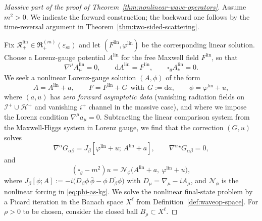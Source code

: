\documentclass[11pt]{article}
\numberwithin{equation}{section}
\theoremstyle{plain}
\theoremstyle{definition}
\theoremstyle{remark}
\newcommand{\dd}{\mathrm{d}}
\begin{document}
\begin{proof}[Massive part of the proof of Theorem~\ref{thm:nonlinear-wave-operators}]
Assume $m^{2}>0$.  We indicate the forward construction; the backward one follows by the time-reversal argument in Theorem~\ref{thm:two-sided-scattering}.

Fix $\mathcal R_{+}^{\mathrm{lin}}\in\mathfrak R_{+}^{(m)}(\varepsilon_{\mathrm{sc}})$ and let $(F^{\mathrm{lin}},\varphi^{\mathrm{lin}})$ be the corresponding linear solution.
Choose a Lorenz-gauge potential $A^{\mathrm{lin}}$ for the free Maxwell field $F^{\mathrm{lin}}$, so that
\begin{equation}
\nabla^\mu A^{\mathrm{lin}}_\mu=0,
\qquad
\dd A^{\mathrm{lin}}=F^{\mathrm{lin}},
\qquad
\square_g A^{\mathrm{lin}}_\nu=0.
\end{equation}
We seek a nonlinear Lorenz-gauge solution $(A,\phi)$ of the form
\begin{equation}
A=A^{\mathrm{lin}}+a,
\qquad
F=F^{\mathrm{lin}}+G\ \ \text{with}\ \ G:=\dd a,
\qquad
\phi=\varphi^{\mathrm{lin}}+u,
\end{equation}
where $(a,u)$ has \emph{zero forward asymptotic data} (vanishing radiation fields on $\mathcal I^{+}\cup\mathcal H^{+}$ and vanishing $i^{+}$ channel in the massive case), and where we impose the Lorenz condition $\nabla^\mu a_\mu=0$.
Subtracting the linear comparison system from the Maxwell-Higgs system in Lorenz gauge, we find that the correction $(G,u)$ solves
\begin{equation}\label{eq:waveop-inhom-maxwell}
\nabla^\alpha G_{\alpha\beta}=J_\beta[\varphi^{\mathrm{lin}}+u;\,A^{\mathrm{lin}}+a],
\qquad
\nabla^\alpha{}^\star G_{\alpha\beta}=0,
\end{equation}
and
\begin{equation}\label{eq:waveop-inhom-kg}
(\square_g-m^{2})u=\mathcal N_\phi\bigl(A^{\mathrm{lin}}+a,\ \varphi^{\mathrm{lin}}+u\bigr),
\end{equation}
where $J_\beta[\phi;A]:=-i\bigl(D_\beta\phi\,\bar\phi-\phi\,\overline{D_\beta\phi}\bigr)$ with $D_\mu=\nabla_\mu-iA_\mu$, and $\mathcal N_\phi$ is the nonlinear forcing in \eqref{eq:phi-as-kg}.
We solve the nonlinear final-state problem by a Picard iteration in the Banach space $X^{\ell}$ from Definition~\ref{def:waveop-space}.
For $\rho>0$ to be chosen, consider the closed ball $B_\rho\subset X^{\ell}$.


\end{proof}
\end{document}
